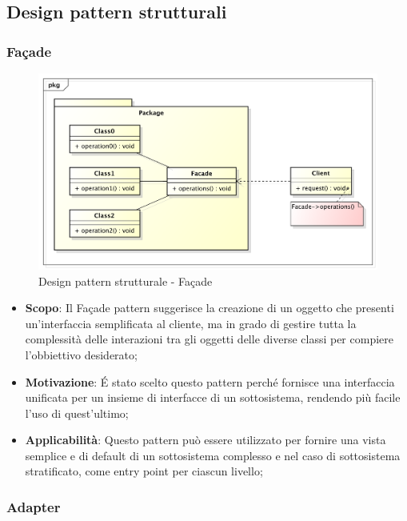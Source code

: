 	\clearpage
	\newpage
	\subsection{Design pattern strutturali} %
		\subsubsection{Fa\c{c}ade} %
		\begin{figure}[htbp]
			\centering
			\centerline{\includegraphics[scale=0.5]{./images/designpatternappendice/facade.pdf}}
			\caption{Design pattern strutturale - Fa\c{c}ade}
		\end{figure}

		\begin{itemize}
			\item \textbf{Scopo}: Il Fa\c{c}ade pattern suggerisce la creazione di un oggetto che presenti un'interfaccia semplificata al cliente, ma in grado di gestire tutta la complessità delle interazioni tra gli oggetti delle diverse classi per compiere l'obbiettivo desiderato;
			\item \textbf{Motivazione}: \'E stato scelto questo pattern perché fornisce una interfaccia unificata per un insieme di interfacce di un sottosistema, rendendo più facile l'uso di quest'ultimo;
			\item \textbf{Applicabilità}: Questo pattern può essere utilizzato per fornire una vista semplice e di default di un sottosistema complesso e nel caso di sottosistema stratificato, come entry point per ciascun livello;
		\end{itemize}



		\newpage
		\subsubsection{Adapter} %


